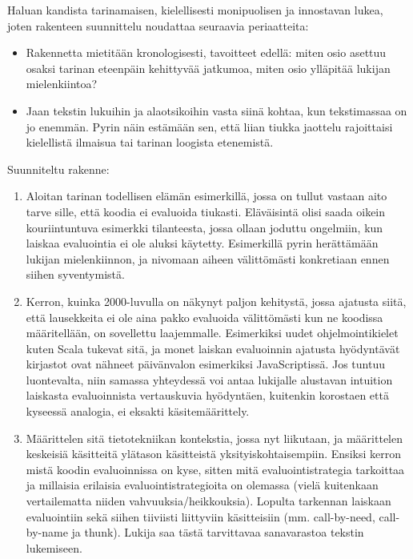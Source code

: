 \documentclass[12pt,a4paper,finnish,oneside]{article}
\begin{document}
Haluan kandista tarinamaisen, kielellisesti monipuolisen ja innostavan lukea, joten rakenteen suunnittelu noudattaa seuraavia periaatteita:

\begin{itemize}
  \item Rakennetta mietitään kronologisesti, tavoitteet edellä: miten osio asettuu osaksi tarinan eteenpäin kehittyvää jatkumoa, miten osio ylläpitää lukijan mielenkiintoa?
  \item Jaan tekstin lukuihin ja alaotsikoihin vasta siinä kohtaa, kun tekstimassaa on jo enemmän. Pyrin näin estämään sen, että liian tiukka jaottelu rajoittaisi kielellistä ilmaisua tai tarinan loogista etenemistä.
\end{itemize}

Suunniteltu rakenne:

\begin{enumerate}
  \item Aloitan tarinan todellisen elämän esimerkillä, jossa on tullut vastaan aito tarve sille, että koodia ei evaluoida tiukasti. Eläväisintä olisi saada oikein kouriintuntuva esimerkki tilanteesta, jossa ollaan joduttu ongelmiin, kun laiskaa evaluointia ei ole aluksi käytetty. Esimerkillä pyrin herättämään lukijan mielenkiinnon, ja nivomaan aiheen välittömästi konkretiaan ennen siihen syventymistä.

  \item Kerron, kuinka 2000-luvulla on näkynyt paljon kehitystä, jossa ajatusta siitä, että lausekkeita ei ole aina pakko evaluoida välittömästi kun ne koodissa määritellään, on sovellettu laajemmalle. Esimerkiksi uudet ohjelmointikielet kuten Scala tukevat sitä, ja monet laiskan evaluoinnin ajatusta hyödyntävät kirjastot ovat nähneet päivänvalon esimerkiksi JavaScriptissä. Jos tuntuu luontevalta, niin samassa yhteydessä voi antaa lukijalle alustavan intuition laiskasta evaluoinnista vertauskuvia hyödyntäen, kuitenkin korostaen että kyseessä analogia, ei eksakti käsitemäärittely.

  \item Määrittelen sitä tietotekniikan kontekstia, jossa nyt liikutaan, ja määrittelen keskeisiä käsitteitä ylätason käsitteistä yksityiskohtaisempiin. Ensiksi kerron mistä koodin evaluoinnissa on kyse, sitten mitä evaluointistrategia tarkoittaa ja millaisia erilaisia evaluointistrategioita on olemassa (vielä kuitenkaan vertailematta niiden vahvuuksia/heikkouksia). Lopulta tarkennan laiskaan evaluointiin sekä siihen tiiviisti liittyviin käsitteisiin (mm. call-by-need, call-by-name ja thunk). Lukija saa tästä tarvittavaa sanavarastoa tekstin lukemiseen.


\end{enumerate}
\end{document}

